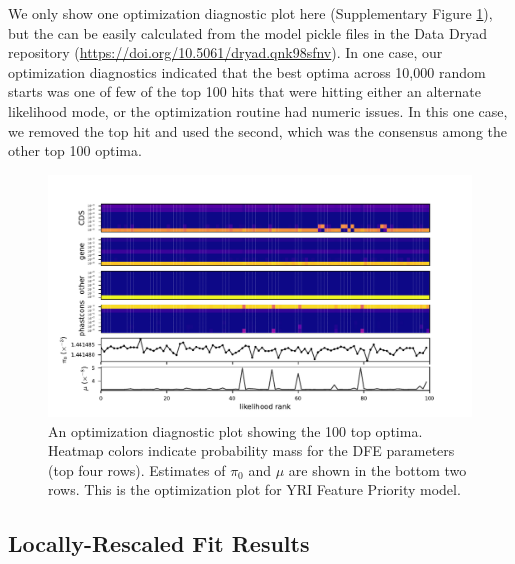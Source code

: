 \documentclass[11pt]{article}
\begin{document}
We only show one optimization diagnostic plot here (Supplementary Figure
\ref{suppfig:diag-plot}), but the can be easily calculated from the model
pickle files in the Data Dryad repository
(\url{https://doi.org/10.5061/dryad.qnk98sfnv}). In one case, our optimization
diagnostics indicated that the best optima across 10,000 random starts was one
of few of the top 100 hits that were hitting either an alternate likelihood
mode, or the optimization routine had numeric issues. In this one case, we
removed the top hit and used the second, which was the consensus among the
other top 100 optima. 

\begin{figure}[htbp]
  \label{suppfig:diag-plot}
  \centering
  \includegraphics[width=\textwidth]{figures/supplementary/figure_feature_priority_yri_full_diag.pdf}

  \caption{ An optimization diagnostic plot showing the 100 top optima. Heatmap
  colors indicate probability mass for the DFE parameters (top four rows).
  Estimates of $\pi_0$ and $\mu$ are shown in the bottom two rows. This is the
optimization plot for YRI Feature Priority model.}
\end{figure}

\clearpage
\subsection{Locally-Rescaled Fit Results}
\label{supp:locally-rescaled-fits}
\end{document}
